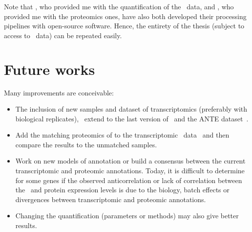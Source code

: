 Note that \nuno, who provided me with the quantification of the \gtex\ data,
and \james, who provided me with the proteomics ones,
have also both developed their processing pipelines with open-source software.
Hence, the entirety of the thesis (subject to access to \gtex\ data)
can be repeated easily.\mybr\

\section*{Future works}
Many improvements are conceivable:\mybr\
\begin{itemize}[topsep=0pt,nosep]
        \item The inclusion of new samples and dataset of transcriptomics
            (preferably with biological replicates),
            \eg\ extend to the last version of \gtex\ and
            the ANTE dataset~.
        \item Add the matching proteomics of \citet{Wang2019-ut}
            to the transcriptomic \uhlen\ data~\mycite{Uhlen2015}
            and then compare the results to the unmatched samples.
        \item Work on new models of annotation or
            build a consensus between the current transcriptomic and proteomic
            annotations.
            Today, it is difficult to determine for some genes
            if the observed anticorrelation or lack of correlation
            between the \mRNA\ and protein expression levels is due to the biology,
            batch effects or divergences between transcriptomic and
            proteomic annotations.
        \item Changing the quantification (parameters or methods)
            may also give better results.
\end{itemize}

